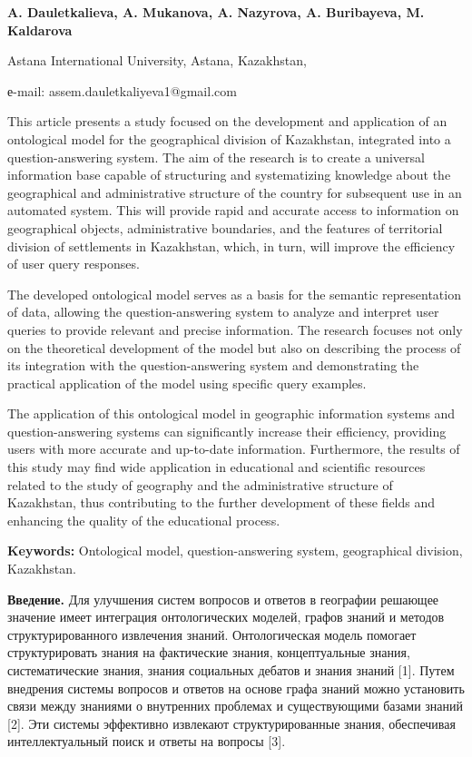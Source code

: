 \textbf{A. Dauletkalieva, A. Mukanova, A. Nazyrova, A. Buribayeva, M.
Kaldarova}

Astana International University, Astana, Kazakhstan,

е-mail: assem.dauletkaliyeva1@gmail.com

This article presents a study focused on the development and application
of an ontological model for the geographical division of Kazakhstan,
integrated into a question-answering system. The aim of the research is
to create a universal information base capable of structuring and
systematizing knowledge about the geographical and administrative
structure of the country for subsequent use in an automated system. This
will provide rapid and accurate access to information on geographical
objects, administrative boundaries, and the features of territorial
division of settlements in Kazakhstan, which, in turn, will improve the
efficiency of user query responses.

The developed ontological model serves as a basis for the semantic
representation of data, allowing the question-answering system to
analyze and interpret user queries to provide relevant and precise
information. The research focuses not only on the theoretical
development of the model but also on describing the process of its
integration with the question-answering system and demonstrating the
practical application of the model using specific query examples.

The application of this ontological model in geographic information
systems and question-answering systems can significantly increase their
efficiency, providing users with more accurate and up-to-date
information. Furthermore, the results of this study may find wide
application in educational and scientific resources related to the study
of geography and the administrative structure of Kazakhstan, thus
contributing to the further development of these fields and enhancing
the quality of the educational process.

\textbf{Keywords:} Ontological model, question-answering system,
geographical division, Kazakhstan.

\textbf{Введение.} Для улучшения систем вопросов и ответов в географии
решающее значение имеет интеграция онтологических моделей, графов знаний
и методов структурированного извлечения знаний. Онтологическая модель
помогает структурировать знания на фактические знания, концептуальные
знания, систематические знания, знания социальных дебатов и знания
знаний {[}1{]}. Путем внедрения системы вопросов и ответов на основе
графа знаний можно установить связи между знаниями о внутренних
проблемах и существующими базами знаний {[}2{]}. Эти системы эффективно
извлекают структурированные знания, обеспечивая интеллектуальный поиск и
ответы на вопросы {[}3{]}.

